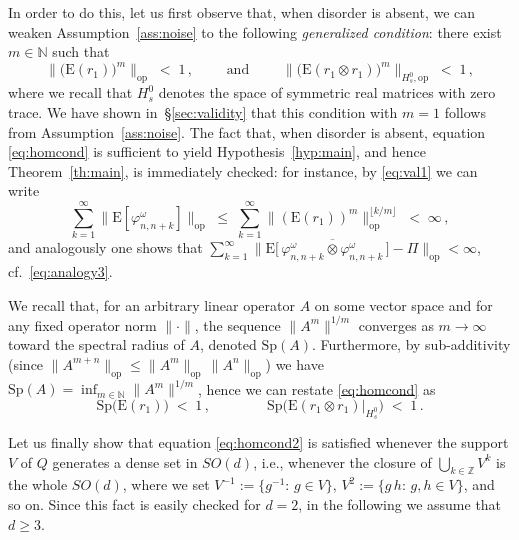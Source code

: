 \documentclass[a4paper,reqno,11pt]{amsart}
\numberwithin{equation}{section}
\newcommand{\go}{\omega}
\DeclareMathOperator*{\union}{\bigcup}       %
\newcommand{\Z}{\mathbb{Z}}
\newcommand{\N}{\mathbb{N}}
\def\bE{\ensuremath{\bs{\mathrm{E}}}}
\def\bs{\boldsymbol}
\renewcommand{\phi}{\varphi}
\begin{document}
In order to do this, let us first observe that, 
when disorder is absent, we can weaken Assumption~\ref{ass:noise}
to the following {\sl generalized condition}: there exist $m \in \N$ such that
\begin{equation} \label{eq:homcond}
	\big\| \big( \bE(r_1) \big)^m \big\|_{\text{op}} \;<\; 1 \,, \qquad 
	\text{ and }\qquad
	\big\| \big( \bE(r_1 \otimes r_1) \big)^m \big\|_{H^0_s, \text{op}} \;<\; 1 \,,
\end{equation}
where we recall that $H^0_s$ denotes the space of symmetric real matrices
with zero trace.
We have shown in~\S\ref{sec:validity} that 
this condition with $m=1$ follows from Assumption~\ref{ass:noise}.
The fact that, when disorder is absent, equation \eqref{eq:homcond} is sufficient
to yield Hypothesis~\ref{hyp:main}, and hence Theorem~\ref{th:main}, is immediately
checked: for instance, by \eqref{eq:val1} we can write 
\begin{equation}
	\sum_{k=1}^\infty \big\| \bE[\phi^\go_{n,n+k}] \big\|_{\text{op}}
	\;\le\; \sum_{k=1}^\infty \big\| (\bE( r_1 ))^m \big\|_{\text{op}}^{\lfloor k/m \rfloor}
	\;<\; \infty\,,
\end{equation}
and analogously one shows that 
$\sum_{k=1}^\infty \big\| 
\bE\big[\,\overline{\phi^\go_{n,n+k} \otimes \phi^\go_{n,n+k}}\,\big]
- \Pi \big\|_{\text{op}} < \infty$, cf.~\eqref{eq:analogy3}.

We recall that, for an arbitrary linear operator $A$
on some vector space and for any fixed operator norm $\| \cdot \|$, 
the sequence $\| A^m \|^{1/m}$ converges as $m \to \infty$
toward the spectral radius of $A$, denoted $\text{Sp}(A)$. 
Furthermore, by sub-additivity 
(since $\|A^{m+n}\|_{\text{op}} \le \|A^m\|_{\text{op}} \, \|A^n\|_{\text{op}}$) 
we have
$\text{Sp}(A) =
\inf_{m \in \N} \| A^m \|^{1/m}$, hence we can restate \eqref{eq:homcond} as
\begin{equation} \label{eq:homcond2}
	\text{Sp}\big( \bE(r_1) \big) \;<\; 1 \,, \qquad \qquad
	\text{Sp}\big( \bE(r_1 \otimes r_1) |_{H^0_s} \big) \;<\; 1 \,.
\end{equation}

\smallskip

Let us finally show that equation \eqref{eq:homcond2} is satisfied whenever
the support $V$ of $Q$ generates a dense set in $SO(d)$, i.e., whenever
the closure of $\union_{k \in \Z} V^k$ is the whole $SO(d)$,
where we set $V^{-1} := \{g^{-1}: \, g \in V\}$, $V^2 := \{g \, h: \, g,h \in V\}$,
and so on. Since this fact is easily checked for $d=2$,
in the following we assume that $d \ge 3$.
\end{document}
